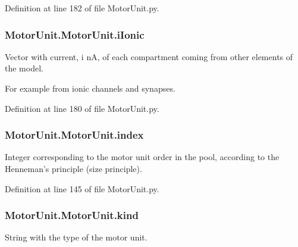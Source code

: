 Definition at line 182 of file Motor\-Unit.\-py.

\hypertarget{class_motor_unit_1_1_motor_unit_a0541858216e7d01582312f9a7a99d595}{
\subsubsection[{i\-Ionic}]{\setlength{\rightskip}{0pt plus 5cm}Motor\-Unit.\-Motor\-Unit.\-i\-Ionic}}\label{class_motor_unit_1_1_motor_unit_a0541858216e7d01582312f9a7a99d595}


Vector with current, i n\-A, of each compartment coming from other elements of the model. 

For example from ionic channels and synapses. 

Definition at line 180 of file Motor\-Unit.\-py.

\hypertarget{class_motor_unit_1_1_motor_unit_a4f3205a9273aabb92d425992d91a1848}{
\subsubsection[{index}]{\setlength{\rightskip}{0pt plus 5cm}Motor\-Unit.\-Motor\-Unit.\-index}}\label{class_motor_unit_1_1_motor_unit_a4f3205a9273aabb92d425992d91a1848}


Integer corresponding to the motor unit order in the pool, according to the Henneman's principle (size principle). 



Definition at line 145 of file Motor\-Unit.\-py.

\hypertarget{class_motor_unit_1_1_motor_unit_a08ed5171ba46e0b1ea5bc7d08296c612}{
\subsubsection[{kind}]{\setlength{\rightskip}{0pt plus 5cm}Motor\-Unit.\-Motor\-Unit.\-kind}}\label{class_motor_unit_1_1_motor_unit_a08ed5171ba46e0b1ea5bc7d08296c612}


String with the type of the motor unit. 

